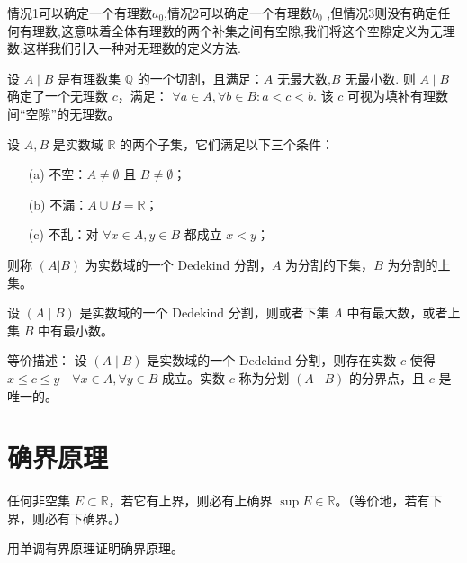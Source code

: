     情况1可以确定一个有理数$a_0$,情况2可以确定一个有理数$b_0$ ,但情况3则没有确定任何有理数,这意味着全体有理数的两个补集之间有空隙,我们将这个空隙定义为无理数.这样我们引入一种对无理数的定义方法.
    \begin{definition}[定义无理数]
    设 $A\mid B$ 是有理数集 $\mathbb{Q}$ 的一个切割，且满足：$A$ 无最大数,$B$ 无最小数.
    则 $A \mid B$ 确定了一个无理数 $c$，满足：
    $\forall a \in A, \forall b \in B: a < c < b$.
    该 $c$ 可视为填补有理数间“空隙”的无理数。
    \end{definition}
    \begin{definition}[Dedekind原理]
        设 $A, B$ 是实数域 $\mathbb{R}$ 的两个子集，它们满足以下三个条件：
        
        \begin{enumerate}
        \item[(a)] 不空：$A \neq \emptyset$ 且 $B \neq \emptyset$；
        \item[(b)] 不漏：$A \cup B = \mathbb{R}$；
        \item[(c)] 不乱：对 $\forall x \in A, y \in B$ 都成立 $x < y$；
        \end{enumerate}
        
        则称 $(A|B)$ 为实数域的一个 \textsf{Dedekind} 分割，$A$ 为分割的下集，$B$ 为分割的上集。
    \end{definition}

    \begin{theorem}[Dedekind分割定理]
        设 $(A \mid B)$ 是实数域的一个 \textsf{Dedekind} 分割，则或者下集 $A$ 中有最大数，或者上集 $B$ 中有最小数。

        等价描述：
        设 $(A \mid B)$ 是实数域的一个 \textsf{Dedekind} 分割，则存在实数 $c$ 使得
        $x \leq c \leq y \quad \forall x \in A, \forall y \in B$
        成立。实数 $c$ 称为分划 $(A\mid B)$ 的分界点，且 $c$ 是唯一的。
    \end{theorem}


\newpage
\section{确界原理}
\begin{theorem*}[确界原理]
    任何非空集 \( E \subset \mathbb{R} \)，若它有上界，则必有上确界 \(\sup E \in \mathbb{R}\)。（等价地，若有下界，则必有下确界。）
\end{theorem*}

\begin{problem}
    用单调有界原理证明确界原理。
\end{problem}

